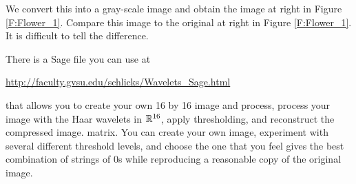 We convert this into a gray-scale image and obtain the image at right in Figure \ref{F:Flower_1}. Compare this image to the original at right in Figure \ref{F:Flower_1}. It is difficult to tell the difference.

There is a Sage file you can use at 
\begin{center} \url{http://faculty.gvsu.edu/schlicks/Wavelets_Sage.html}  \end{center}
that allows you to create your own 16 by 16 image and process, process your image with the Haar wavelets in $\mathbb{R}^{16}$, apply thresholding, and reconstruct the compressed image. matrix. You can create your own image, experiment with several different threshold levels, and choose the one that you feel gives the best combination of strings of 0s while reproducing a reasonable copy of the original image. 

		


